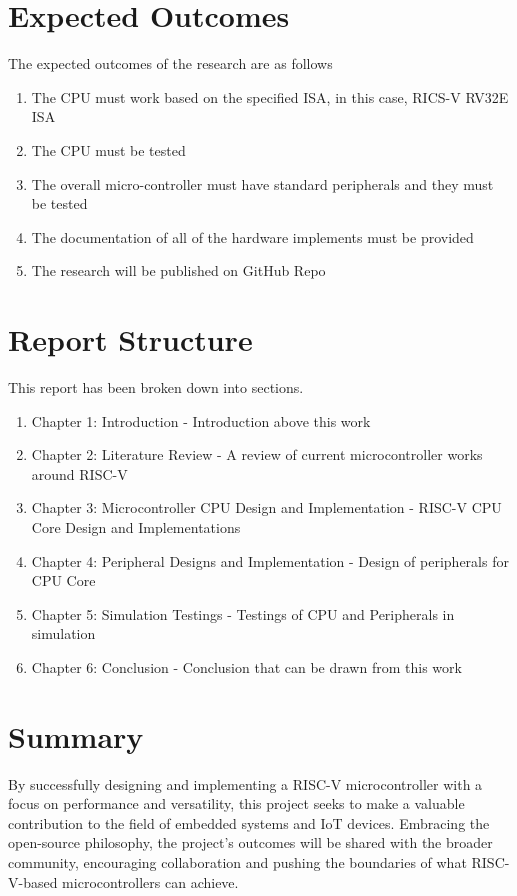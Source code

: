 \section{Expected Outcomes}
The expected outcomes of the research are as follows
\begin{enumerate}
	\item The CPU must work based on the specified ISA, in this case, RICS-V RV32E ISA
	\item The CPU must be tested
	\item The overall micro-controller must have standard peripherals and they must be tested
	\item The documentation of all of the hardware implements must be provided
	\item The research will be published on GitHub Repo

\end{enumerate}

\section{Report Structure}
This report has been broken down into sections.
\begin{enumerate}
  \item Chapter 1: Introduction - Introduction above this work
  \item Chapter 2: Literature Review - A review of current microcontroller works around RISC-V
  \item Chapter 3: Microcontroller CPU Design and Implementation - RISC-V CPU Core Design and Implementations
  \item Chapter 4: Peripheral Designs and Implementation - Design of peripherals for CPU Core
  \item Chapter 5: Simulation Testings - Testings of CPU and Peripherals in simulation
  \item Chapter 6: Conclusion - Conclusion that can be drawn from this work
\end{enumerate}

\section{Summary}
By successfully designing and implementing a RISC-V microcontroller with a focus on performance and versatility, 
this project seeks to make a valuable contribution to the field of embedded systems and IoT devices. 
Embracing the open-source philosophy, the project's outcomes will be shared with the broader community, 
encouraging collaboration and pushing the boundaries of what RISC-V-based microcontrollers can achieve.
